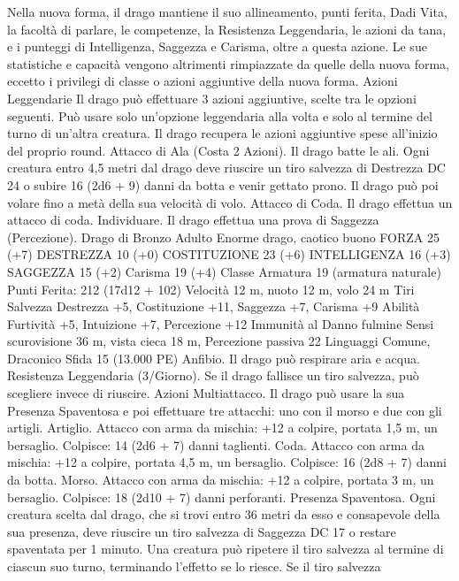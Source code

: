 \begin{multicols}{2}
Nella nuova forma, il drago mantiene il suo allineamento, punti
ferita, Dadi Vita, la facoltà di parlare, le competenze, la Resistenza
Leggendaria, le azioni da tana, e i punteggi di Intelligenza, Saggezza
e Carisma, oltre a questa azione. Le sue statistiche e capacità
vengono altrimenti rimpiazzate da quelle della nuova forma, eccetto i
privilegi di classe o azioni aggiuntive della nuova forma.
Azioni Leggendarie
Il drago può effettuare 3 azioni aggiuntive, scelte tra le opzioni
seguenti. Può usare solo un’opzione leggendaria alla volta e solo
al termine del turno di un’altra creatura. Il drago recupera le
azioni aggiuntive spese all’inizio del proprio round.
Attacco di Ala (Costa 2 Azioni). Il drago batte le ali. Ogni
creatura entro 4,5 metri dal drago deve riuscire un tiro salvezza
di Destrezza DC 24 o subire 16 (2d6 + 9) danni da botta e
venir gettato prono. Il drago può poi volare fino a metà della sua
velocità di volo.
Attacco di Coda. Il drago effettua un attacco di coda.
Individuare. Il drago effettua una prova di Saggezza
(Percezione).
Drago di Bronzo Adulto
Enorme drago, caotico buono
FORZA 25 (+7)
DESTREZZA 10 (+0)
COSTITUZIONE 23 (+6)
INTELLIGENZA 16 (+3)
SAGGEZZA 15 (+2)
Carisma 19 (+4)
Classe Armatura 19 (armatura naturale)
\hspace*{0pt}\hfill{Punti Ferita}: 212 (17d12 + 102)
Velocità 12 m, nuoto 12 m, volo 24 m
Tiri Salvezza Destrezza +5, Costituzione +11, Saggezza +7,
Carisma +9
Abilità Furtività +5, Intuizione +7, Percezione +12
Immunità al Danno fulmine
Sensi scurovisione 36 m, vista cieca 18 m, Percezione passiva 22
Linguaggi Comune, Draconico
Sfida 15 (13.000 PE)
Anfibio. Il drago può respirare aria e acqua.
Resistenza Leggendaria (3/Giorno). Se il drago fallisce un tiro
salvezza, può scegliere invece di riuscire.
Azioni
Multiattacco. Il drago può usare la sua Presenza Spaventosa e
poi effettuare tre attacchi: uno con il morso e due con gli artigli.
Artiglio. Attacco con arma da mischia: +12 a colpire, portata 1,5
m, un bersaglio.
Colpisce: 14 (2d6 + 7) danni taglienti.
Coda. Attacco con arma da mischia: +12 a colpire, portata 4,5
m, un bersaglio.
Colpisce: 16 (2d8 + 7) danni da botta.
Morso. Attacco con arma da mischia: +12 a colpire, portata 3 m,
un bersaglio.
Colpisce: 18 (2d10 + 7) danni perforanti.
Presenza Spaventosa. Ogni creatura scelta dal drago, che si trovi
entro 36 metri da esso e consapevole della sua presenza, deve
riuscire un tiro salvezza di Saggezza DC 17 o restare spaventata per
1 minuto. Una creatura può ripetere il tiro salvezza al termine di
ciascun suo turno, terminando l’effetto se lo riesce. Se il tiro salvezza

\end{multicols}
